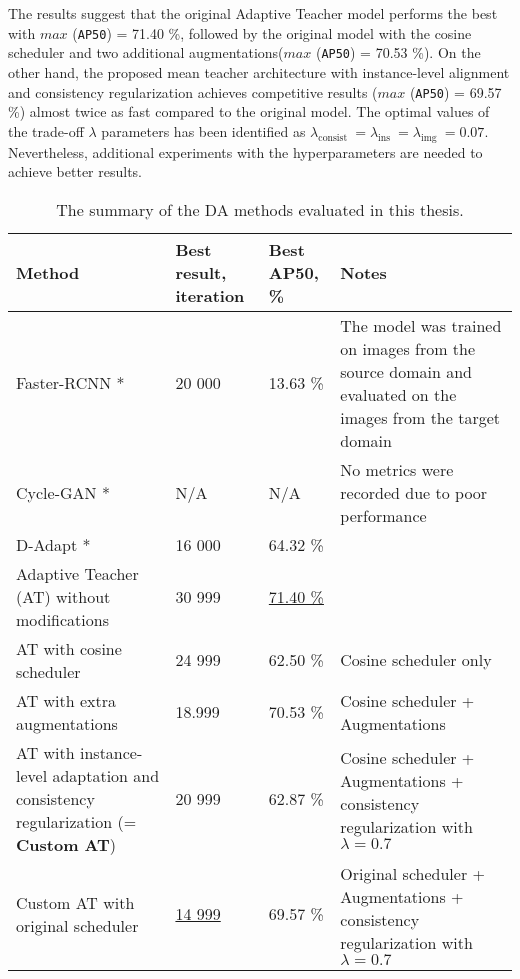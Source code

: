 The results suggest that the original Adaptive Teacher model performs the best with $max$ (\texttt{AP50}) = 71.40 \%, followed by the original model with the cosine scheduler and two additional augmentations($max$ (\texttt{AP50}) = 70.53 \%).  On the other hand, the proposed mean teacher architecture with instance-level alignment and consistency regularization achieves competitive results ($max$ (\texttt{AP50}) = 69.57 \%) almost twice as fast compared to the original model. The optimal values of the trade-off $\lambda$ parameters has been identified as $\lambda_{\text {consist }} = \lambda_{\text {ins }} = \lambda_{\text {img }} = 0.07$. Nevertheless, additional experiments with the hyperparameters are needed to achieve better results. 

\begin{table}
\centering
\caption{The summary of the DA methods evaluated in this thesis.}\label{summary_table_1} 
\begin{tabularx}{0.95\textwidth}{|X|X|X|X|} 
        \hline
        \textbf{Method} & \textbf{Best result, iteration} & \textbf{Best AP50, \%} & \textbf{Notes} \\
        \hline
        Faster-RCNN \cite{ima} * & 20 000 & 13.63 \% & \multicolumn{1}{m{3cm}|}{The model was trained on images from the source domain and evaluated on the images from the target domain} \\ 
        \hline
        Cycle-GAN \cite{Zhu2017} * & N/A & N/A & \multicolumn{1}{m{3cm}|}{No metrics were recorded due to poor performance}\\ 
        \hline
        D-Adapt \cite{Jiang2021} * & 16 000 & 64.32 \% & \multicolumn{1}{m{3cm}|}{} \\ 
        \hline
        Adaptive Teacher (AT) \cite{Li2021} without modifications & 30 999 & \uline{71.40 \%} & \multicolumn{1}{m{3cm}|}{} \\ 
        \hline
        AT with cosine scheduler & 24 999 & 62.50 \% & \multicolumn{1}{m{3cm}|}{Cosine scheduler only} \\ 
        \hline
        AT with extra augmentations & 18.999 & 70.53 \% & \multicolumn{1}{m{3cm}|}{Cosine scheduler + Augmentations} \\ 
        \hline
        AT with instance-level adaptation and consistency regularization (= \textbf{Custom AT}) & 20 999 & 62.87 \% & \multicolumn{1}{m{3cm}|}{Cosine scheduler + Augmentations + consistency regularization with $\lambda = 0.7$}  \\ 
        \hline
        Custom AT with original scheduler & \uline{14 999} & 69.57 \% & \multicolumn{1}{m{3cm}|}{Original scheduler + Augmentations + consistency regularization with $\lambda = 0.7$ } \\ 

\end{tabularx}
\end{table}
